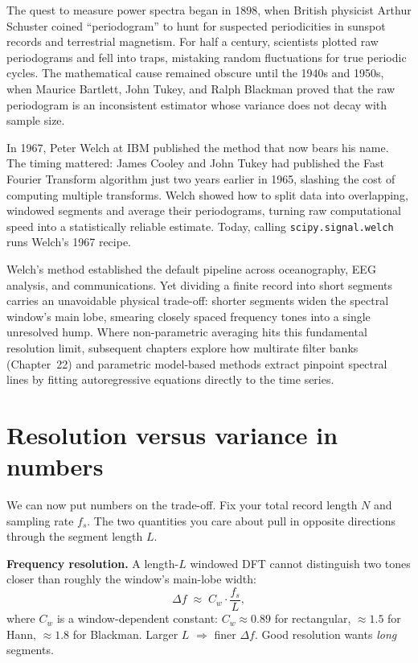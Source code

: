 \begin{historybox}
The quest to measure power spectra began in 1898, when British physicist Arthur Schuster coined
``periodogram'' to hunt for suspected periodicities in sunspot records and terrestrial magnetism.
For half a century, scientists plotted raw periodograms and fell into traps, mistaking random fluctuations
for true periodic cycles. The mathematical cause remained obscure until the 1940s and 1950s, when
Maurice Bartlett, John Tukey, and Ralph Blackman proved that the raw periodogram is an inconsistent
estimator whose variance does not decay with sample size.

In 1967, Peter Welch at IBM published the method that now bears his name. The timing
mattered: James Cooley and John Tukey had published the Fast Fourier Transform algorithm just two years
earlier in 1965, slashing the cost of computing multiple transforms. Welch showed how to split data into
overlapping, windowed segments and average their periodograms, turning raw computational speed into
a statistically reliable estimate. Today, calling \texttt{scipy.signal.welch} runs Welch's
1967 recipe.

Welch's method established the default pipeline across oceanography, EEG analysis, and communications.
Yet dividing a finite record into short segments carries an unavoidable physical trade-off: shorter
segments widen the spectral window's main lobe, smearing closely spaced frequency tones into a single
unresolved hump. Where non-parametric averaging hits this fundamental resolution limit, subsequent
chapters explore how multirate filter banks (Chapter~22) and parametric model-based methods extract
pinpoint spectral lines by fitting autoregressive equations directly to the time series.
\end{historybox}

\section{Resolution versus variance in numbers}
\label{ch21:resolution-variance}

We can now put numbers on the trade-off. Fix
your total record length $N$ and sampling rate $f_s$. The two quantities you care
about pull in opposite directions through the segment length $L$.

\textbf{Frequency resolution.} A length-$L$ windowed DFT cannot distinguish two
tones closer than roughly the window's main-lobe width:
\[
\Delta f \;\approx\; C_w \cdot \frac{f_s}{L},
\]
where $C_w$ is a window-dependent constant: $C_w\approx 0.89$ for rectangular,
$\approx 1.5$ for Hann, $\approx 1.8$ for Blackman. Larger $L$ $\Rightarrow$ finer
$\Delta f$. Good resolution wants \emph{long} segments.

